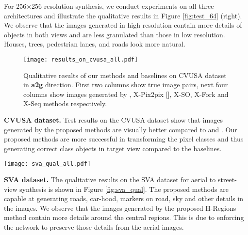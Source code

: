 \documentclass[times,twocolumn,final,authoryear]{elsarticle_modified}
\begin{document}
For 256$\times$256 resolution synthesis, we conduct experiments on all three architectures and illustrate the qualitative results in Figure \ref{fig:test_64} (right). We observe that the images generated in high resolution contain more details of objects in both views and are less granulated than those in low resolution. Houses, trees, pedestrian lanes, and roads look more natural. 


\begin{figure}
\centering
\texttt{[image: results\_on\_cvusa\_all.pdf]}
\vspace{-18pt}
\caption{\small \label{fig:cvusa}Qualitative results of our methods and baselines on CVUSA dataset in \textbf{a2g} direction. First two columns show true image pairs, next four columns show images generated by \cite{zhai2017crossview}, X-Pix2pix [\cite{pix2pix2017}], X-SO, X-Fork and X-Seq methods respectively.}
\end{figure} 
 



 
\noindent \textbf{CVUSA dataset.} 
Test results on the CVUSA dataset show that images generated by the proposed methods are visually better compared to \cite{zhai2017crossview} and \cite{pix2pix2017}. Our proposed methods are more successful in transforming the pixel classes and thus generating correct class objects in target view compared to the baselines.


 
 
\begin{figure*}
\centering
\texttt{[image: sva\_qual\_all.pdf]}
\vspace{-5pt}
\caption{\small \label{fig:sva_qual} Example images generated by different methods in \textbf{a2g} direction for \textbf{SVA} dataset. }
\end{figure*}


\noindent \textbf{SVA dataset.}
The qualitative results on the SVA dataset for aerial to street-view synthesis is shown in Figure \ref{fig:sva_qual}. The proposed methods are capable at generating roads, car-hood, markers on road, sky and other details in the images. We observe that the images generated by the proposed H-Regions method contain more details around the central regions. This is due to enforcing the network to preserve those details from the aerial images.
\end{document}
